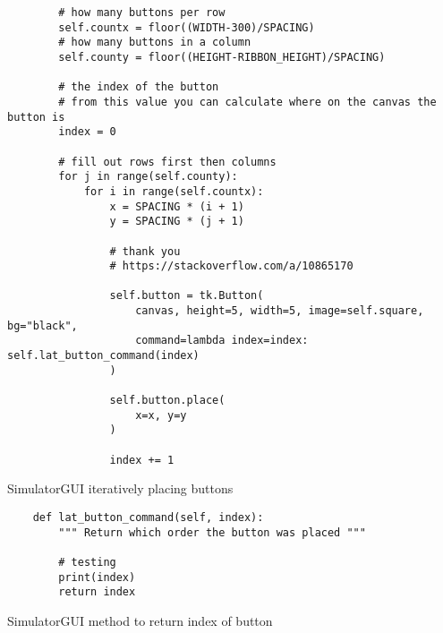 \newpage
\begin{listing}[!ht]
    \begin{verbatim}
        # how many buttons per row
        self.countx = floor((WIDTH-300)/SPACING)
        # how many buttons in a column
        self.county = floor((HEIGHT-RIBBON_HEIGHT)/SPACING)
        
        # the index of the button
        # from this value you can calculate where on the canvas the button is
        index = 0
        
        # fill out rows first then columns
        for j in range(self.county):
            for i in range(self.countx):
                x = SPACING * (i + 1)
                y = SPACING * (j + 1)
                
                # thank you 
                # https://stackoverflow.com/a/10865170
                
                self.button = tk.Button(
                    canvas, height=5, width=5, image=self.square, bg="black",
                    command=lambda index=index: self.lat_button_command(index)
                )
                
                self.button.place(
                    x=x, y=y
                )
                
                index += 1
    \end{verbatim}
    \caption{SimulatorGUI iteratively placing buttons}
    \label{sc:simgui-placing-canvas-buttons}
\end{listing}

\newpage
\begin{listing}[!ht]
    \begin{verbatim}
    def lat_button_command(self, index):
        """ Return which order the button was placed """

        # testing
        print(index)
        return index
    \end{verbatim}
    \caption{SimulatorGUI method to return index of button}
    \label{sc:simgui-return-index-method}
\end{listing}

